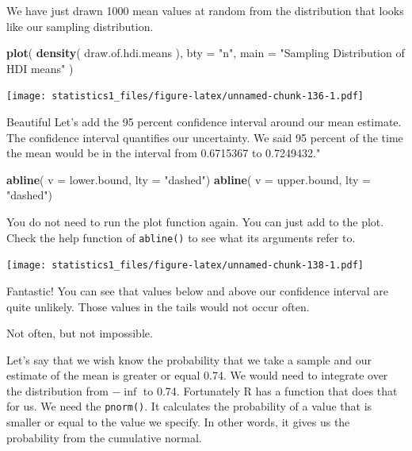 \documentclass[]{article}
\newenvironment{Shaded}{\begin{snugshade}}{\end{snugshade}}
\newcommand{\KeywordTok}[1]{\textcolor[rgb]{0.13,0.29,0.53}{\textbf{#1}}}
\newcommand{\DataTypeTok}[1]{\textcolor[rgb]{0.13,0.29,0.53}{#1}}
\newcommand{\StringTok}[1]{\textcolor[rgb]{0.31,0.60,0.02}{#1}}
\newcommand{\NormalTok}[1]{#1}
\theoremstyle{definition}
\theoremstyle{definition}
\theoremstyle{definition}
\theoremstyle{remark}
\begin{document}
We have just drawn 1000 mean values at random from the distribution that
looks like our sampling distribution.

\begin{Shaded}
\begin{Highlighting}[]
\KeywordTok{plot}\NormalTok{(}
 \KeywordTok{density}\NormalTok{( draw.of.hdi.means ),}
 \DataTypeTok{bty =} \StringTok{"n"}\NormalTok{,}
 \DataTypeTok{main =} \StringTok{"Sampling Distribution of HDI means"}
\NormalTok{)}
\end{Highlighting}
\end{Shaded}

\texttt{[image: statistics1\_files/figure-latex/unnamed-chunk-136-1.pdf]}

Beautiful Let's add the 95 percent confidence interval around our mean
estimate. The confidence interval quantifies our uncertainty. We said 95
percent of the time the mean would be in the interval from 0.6715367 to
0.7249432."

\begin{Shaded}
\begin{Highlighting}[]
\KeywordTok{abline}\NormalTok{( }\DataTypeTok{v =}\NormalTok{ lower.bound, }\DataTypeTok{lty =} \StringTok{"dashed"}\NormalTok{)}
\KeywordTok{abline}\NormalTok{( }\DataTypeTok{v =}\NormalTok{ upper.bound,  }\DataTypeTok{lty =} \StringTok{"dashed"}\NormalTok{)}
\end{Highlighting}
\end{Shaded}

You do not need to run the plot function again. You can just add to the
plot. Check the help function of \texttt{abline()} to see what its
arguments refer to.

\texttt{[image: statistics1\_files/figure-latex/unnamed-chunk-138-1.pdf]}

Fantastic! You can see that values below and above our confidence
interval are quite unlikely. Those values in the tails would not occur
often.

Not often, but not impossible.

Let's say that we wish know the probability that we take a sample and
our estimate of the mean is greater or equal 0.74. We would need to
integrate over the distribution from \(-\inf\) to 0.74. Fortunately R
has a function that does that for us. We need the \texttt{pnorm()}. It
calculates the probability of a value that is smaller or equal to the
value we specify. In other words, it gives us the probability from the
cumulative normal.
\end{document}
